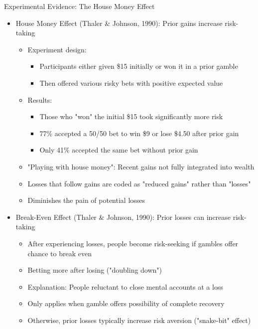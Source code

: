 \documentclass[10pt]{beamer}
\begin{document}
\begin{frame}{Experimental Evidence: The House Money Effect}
  \begin{itemize}[<+->]
    \item House Money Effect (Thaler \& Johnson, 1990): Prior gains increase risk-taking
      \begin{itemize}
        \item Experiment design:
          \begin{itemize}
            \item Participants either given \$15 initially or won it in a prior gamble
            \item Then offered various risky bets with positive expected value
          \end{itemize}
        \item Results:
          \begin{itemize}
            \item Those who "won" the initial \$15 took significantly more risk
            \item 77\% accepted a 50/50 bet to win \$9 or lose \$4.50 after prior gain
            \item Only 41\% accepted the same bet without prior gain
          \end{itemize}
        \item "Playing with house money": Recent gains not fully integrated into wealth
        \item Losses that follow gains are coded as "reduced gains" rather than "losses"
        \item Diminishes the pain of potential losses
      \end{itemize}
    \item Break-Even Effect (Thaler \& Johnson, 1990): Prior losses can increase risk-taking
      \begin{itemize}
        \item After experiencing losses, people become risk-seeking if gambles offer chance to break even
        \item Betting more after losing ("doubling down")
        \item Explanation: People reluctant to close mental accounts at a loss
        \item Only applies when gamble offers possibility of complete recovery
        \item Otherwise, prior losses typically increase risk aversion ("snake-bit" effect)
      \end{itemize}
  \end{itemize}
\end{frame}
\end{document}
